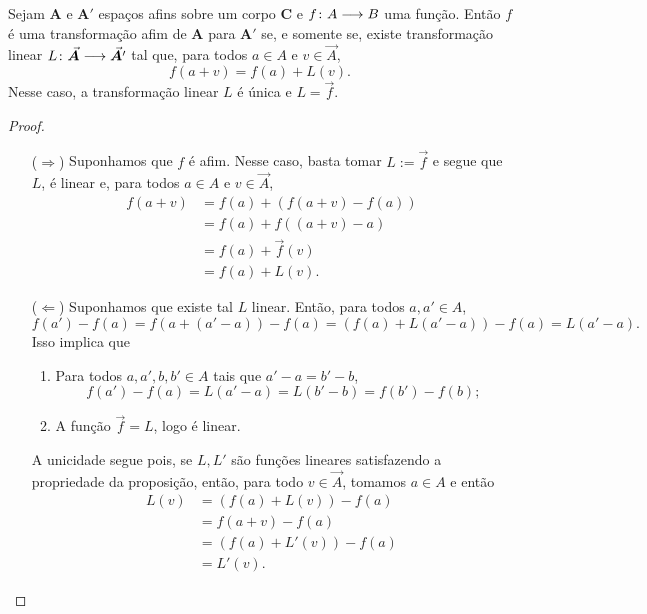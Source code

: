 \begin{proposition}
Sejam $\bm A$ e $\bm A'$ espaços afins sobre um corpo $\bm C$ e  ${f}\colon {A} \longrightarrow {B}$ uma função. Então $f$ é uma transformação afim de $\bm A$ para $\bm A'$ se, e somente se, existe transformação linear ${L}\colon {\vec{\bm A}} \longrightarrow {\vec{\bm A'}}$ tal que, para todos $a \in A$ e $v \in \vec{A}$,
	\begin{equation*}
		f(a+v) = f(a)+L(v).
	\end{equation*}
Nesse caso, a transformação linear $L$ é única e $L=\vec{f}$.
\end{proposition}
\begin{proof}
	\begin{enumerate}
		\item [($\Rightarrow$)] Suponhamos que $f$ é afim. Nesse caso, basta tomar $L:=\vec{f}$ e segue que $L$, é linear e, para todos $a \in A$ e $v \in \vec{A}$,
			\begin{align*}
				f(a+v) &= f(a) + (f(a+v)-f(a)) \\
					&= f(a) + f((a+v)-a) \\
					&= f(a) + \vec{f}(v) \\
					&= f(a) + L(v).
			\end{align*}
		
		\item [($\Leftarrow$)] Suponhamos que existe tal $L$ linear. Então, para todos $a,a' \in A$,
			\begin{equation*}
				f(a')-f(a) = f(a+(a'-a)) - f(a) = (f(a)+L(a'-a)) - f(a) = L(a'-a).
			\end{equation*}
		Isso implica que
			\begin{enumerate}
				\item Para todos $a,a',b,b' \in A$ tais que $a'-a = b'-b$,
					\begin{equation*}
						f(a')-f(a) = L(a'-a) = L(b'-b) = f(b')-f(b);
					\end{equation*}
				\item A função $\vec{f} = L$, logo é linear.
			\end{enumerate}
		A unicidade segue pois, se $L,L'$ são funções lineares satisfazendo a propriedade da proposição, então, para todo $v \in \vec{A}$, tomamos $a \in A$ e então
			\begin{align*}
				L(v) &= (f(a) + L(v)) - f(a) \\
					&= f(a+v) - f(a) \\
					&= (f(a)+L'(v)) - f(a) \\
					&= L'(v).
			\end{align*}
	\end{enumerate}
\end{proof}

